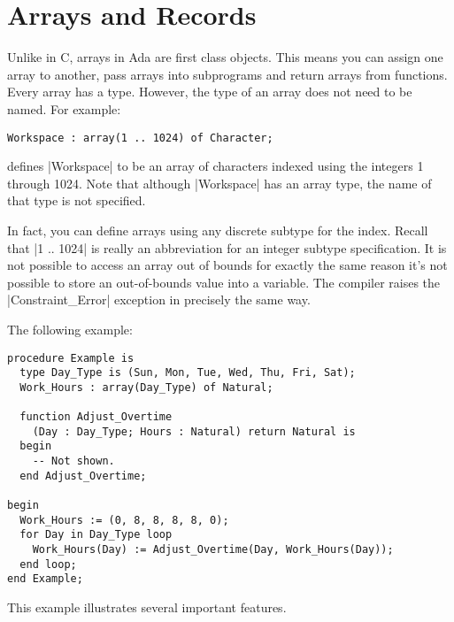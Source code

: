 \section{Arrays and Records}

Unlike in C, arrays in Ada are first class objects. This means you can assign one array to
another, pass arrays into subprograms and return arrays from functions. Every array has a type.
However, the type of an array does not need to be named. For example:

\begin{lstlisting}
Workspace : array(1 .. 1024) of Character;
\end{lstlisting}

\noindent defines |Workspace| to be an array of characters indexed using the integers 1 through
1024. Note that although |Workspace| has an array type, the name of that type is not specified.

In fact, you can define arrays using any discrete subtype for the index. Recall that |1 .. 1024|
is really an abbreviation for an integer subtype specification. It is not possible to access an
array out of bounds for exactly the same reason it's not possible to store an out-of-bounds
value into a variable. The compiler raises the |Constraint_Error| exception in precisely the
same way.

The following example:

\begin{lstlisting}
procedure Example is
  type Day_Type is (Sun, Mon, Tue, Wed, Thu, Fri, Sat);
  Work_Hours : array(Day_Type) of Natural;

  function Adjust_Overtime
    (Day : Day_Type; Hours : Natural) return Natural is
  begin
    -- Not shown.
  end Adjust_Overtime;

begin
  Work_Hours := (0, 8, 8, 8, 8, 0);
  for Day in Day_Type loop
    Work_Hours(Day) := Adjust_Overtime(Day, Work_Hours(Day));
  end loop;
end Example;
\end{lstlisting}

This example illustrates several important features.


